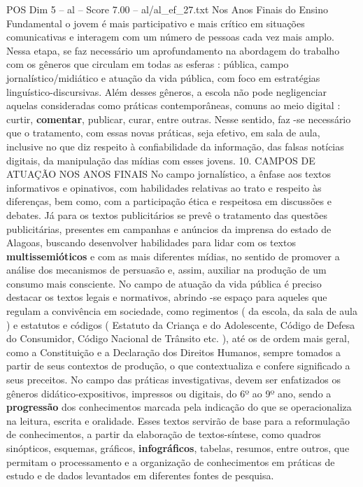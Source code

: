 \begin{textsample}{POS Dim 5 – al – Score 7.00 – al/al\_ef\_27.txt}  \label{ex:f5_pos_047}
Nos Anos Finais do Ensino Fundamental o jovem é mais participativo e mais crítico em situações comunicativas e interagem com um número de pessoas cada vez mais amplo.
Nessa etapa, se faz necessário um aprofundamento na abordagem do trabalho com os gêneros que circulam em todas as esferas : pública, campo jornalístico/midiático e atuação da vida pública, com foco em estratégias linguístico-discursivas.
Além desses gêneros, a escola não pode negligenciar aquelas consideradas como práticas contemporâneas, comuns ao meio digital : curtir, \textbf{comentar}, publicar, curar, entre outras.
Nesse sentido, faz -se necessário que o tratamento, com essas novas práticas, seja efetivo, em sala de aula, inclusive no que diz respeito à confiabilidade da informação, das falsas notícias digitais, da manipulação das mídias com esses jovens. 10.
CAMPOS DE ATUAÇÃO NOS ANOS FINAIS No campo jornalístico, a ênfase aos textos informativos e opinativos, com habilidades relativas ao trato e respeito às diferenças, bem como, com a participação ética e respeitosa em discussões e debates.
Já para os textos publicitários se prevê o tratamento das questões publicitárias, presentes em campanhas e anúncios da imprensa do estado de Alagoas, buscando desenvolver habilidades para lidar com os textos \textbf{multissemióticos} e com as mais diferentes mídias, no sentido de promover a análise dos mecanismos de persuasão e, assim, auxiliar na produção de um consumo mais consciente.
No campo de atuação da vida pública é preciso destacar os textos legais e normativos, abrindo -se espaço para aqueles que regulam a convivência em sociedade, como regimentos ( da escola, da sala de aula ) e estatutos e códigos ( Estatuto da Criança e do Adolescente, Código de Defesa do Consumidor, Código Nacional de Trânsito etc. ), até os de ordem mais geral, como a Constituição e a Declaração dos Direitos Humanos, sempre tomados a partir de seus contextos de produção, o que contextualiza e confere significado a seus preceitos.
No campo das práticas investigativas, devem ser enfatizados os gêneros didático-expositivos, impressos ou digitais, do 6º ao 9º ano, sendo a \textbf{progressão} dos conhecimentos marcada pela indicação do que se operacionaliza na leitura, escrita e oralidade.
Esses textos servirão de base para a reformulação de conhecimentos, a partir da elaboração de textos-síntese, como quadros sinópticos, esquemas, gráficos, \textbf{infográficos}, tabelas, resumos, entre outros, que permitam o processamento e a organização de conhecimentos em práticas de estudo e de dados levantados em diferentes fontes de pesquisa.

\end{textsample}
